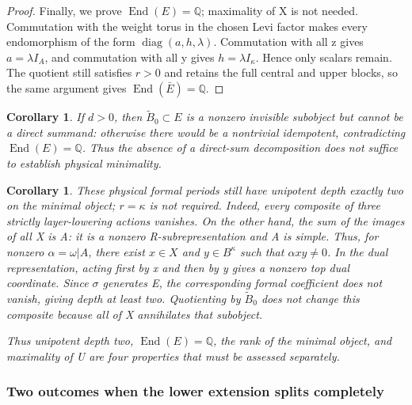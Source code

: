\documentclass[11pt,a4paper,oneside]{article}
\theoremstyle{plain}
\newtheorem{corollary}[theorem]{Corollary}
\theoremstyle{definition}
\theoremstyle{remark}
\numberwithin{equation}{section}
\begin{document}
\begin{proof}
Finally, we prove \(\operatorname{End}(E)=\mathbb Q\); maximality of X is not needed. Commutation with the weight torus in the chosen Levi factor makes every endomorphism of the form \(\operatorname{diag}(a,h,\lambda )\). Commutation with all z gives \(a=\lambda I_A\), and commutation with all y gives \(h=\lambda I_\kappa \). Hence only scalars remain. The quotient still satisfies \(r>0\) and retains the full central and upper blocks, so the same argument gives \(\operatorname{End}(\bar E)=\mathbb Q\).

\end{proof}

\begin{corollary}

\label{thm:core:7.2} If \(d>0\), then \(\widetilde B_0\subset E\) is a nonzero invisible subobject but cannot be a direct summand: otherwise there would be a nontrivial idempotent, contradicting \(\operatorname{End}(E)=\mathbb Q\). Thus the absence of a direct-sum decomposition does not suffice to establish physical minimality.

\end{corollary}

\begin{corollary}

\label{thm:core:7.3} These physical formal periods still have unipotent depth exactly two on the minimal object; \(r=\kappa \) is not required. Indeed, every composite of three strictly layer-lowering actions vanishes. On the other hand, the sum of the images of all X is A: it is a nonzero R-subrepresentation and A is simple. Thus, for nonzero \(\alpha=\omega|A\), there exist \(x\in X\) and \(y\in B^\kappa \) such that \(\alpha xy\ne 0\). In the dual representation, acting first by x and then by y gives a nonzero top dual coordinate. Since \(\sigma \) generates E, the corresponding formal coefficient does not vanish, giving depth at least two. Quotienting by \(\widetilde B_0\) does not change this composite because all of X annihilates that subobject.

Thus unipotent depth two, \(\operatorname{End}(E)=\mathbb Q\), the rank of the minimal object, and maximality of U are four properties that must be assessed separately.

\end{corollary}

\subsubsection{Two outcomes when the lower extension splits completely}\label{sec:core:7.4}
\end{document}
